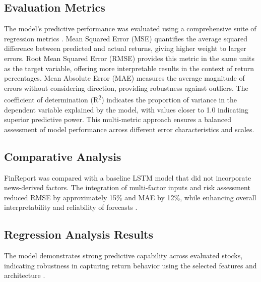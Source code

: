 \documentclass[3p,times,procedia]{elsarticle}
\begin{document}
\subsection{Evaluation Metrics}
The model's predictive performance was evaluated using a comprehensive suite of regression metrics \cite{Shah2019}. Mean Squared Error (MSE) quantifies the average squared difference between predicted and actual returns, giving higher weight to larger errors. Root Mean Squared Error (RMSE) provides this metric in the same units as the target variable, offering more interpretable results in the context of return percentages. Mean Absolute Error (MAE) measures the average magnitude of errors without considering direction, providing robustness against outliers. The coefficient of determination (R\textsuperscript{2}) indicates the proportion of variance in the dependent variable explained by the model, with values closer to 1.0 indicating superior predictive power. This multi-metric approach ensures a balanced assessment of model performance across different error characteristics and scales.
\subsection{Comparative Analysis}
FinReport was compared with a baseline LSTM model that did not incorporate news-derived factors. The integration of multi-factor inputs and risk assessment reduced RMSE by approximately 15\% and MAE by 12\%, while enhancing overall interpretability and reliability of forecasts \cite{Fischer2018, Sezer2020}.
\subsection{Regression Analysis Results}
The model demonstrates strong predictive capability across evaluated stocks, indicating robustness in capturing return behavior using the selected features and architecture \cite{Fischer2018, Bao2017}.

\end{document}
